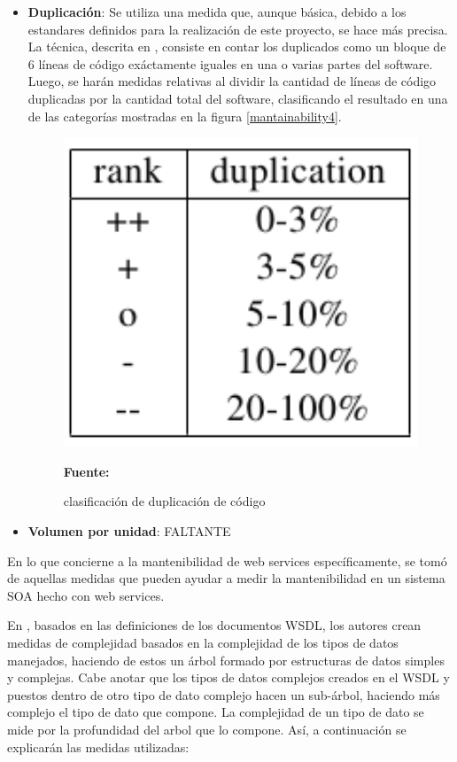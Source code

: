 \begin{itemize}
 \item \textbf{Duplicación}: Se utiliza una medida que, aunque básica, debido a los estandares definidos para la realización de este proyecto, se hace más precisa. La técnica, descrita en \cite{measuring_maintainability}, consiste en contar los duplicados como un bloque de 6 líneas de código exáctamente iguales en una o varias partes del software. Luego, se harán medidas relativas al dividir la cantidad de líneas de código duplicadas por la cantidad total del software, clasificando el resultado en una de las categorías mostradas en la figura \ref{mantainability4}.

\begin{figure}[!htb]
  \begin{center}
    \includegraphics[width=11cm]{./imagenes/mantainability4.png}
    \caption{clasificación de duplicación de código}
    \label{fig:mantainability4}
    \textbf{Fuente:}  \cite{measuring_maintainability}
  \end{center}
\end{figure}

 \item \textbf{Volumen por unidad}: FALTANTE

\end{itemize}

En lo que concierne a la mantenibilidad de web services específicamente, se tomó de \cite{complexity_mesure} aquellas medidas que pueden ayudar a medir la mantenibilidad en un sistema SOA hecho con web services. 

En \cite{complexity_mesure}, basados en las definiciones de los documentos WSDL, los autores crean medidas de complejidad basados en la complejidad de los tipos de datos manejados, haciendo de estos un árbol formado por estructuras de datos simples y complejas. Cabe anotar que los tipos de datos complejos creados en el WSDL y puestos dentro de otro tipo de dato complejo hacen un sub-árbol, haciendo más complejo el tipo de dato que compone. La complejidad de un tipo de dato se mide por la profundidad del arbol que lo compone. Así, a continuación se explicarán las medidas utilizadas:

